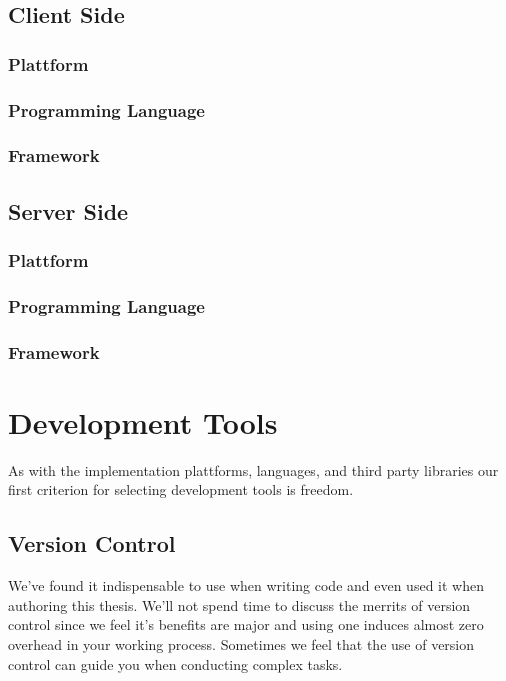\subsection{Client Side}

\subsubsection{Plattform}

\subsubsection{Programming Language}

\subsubsection{Framework}

\subsection{Server Side}

\subsubsection{Plattform}

\subsubsection{Programming Language}

\subsubsection{Framework}

\section{Development Tools}

As with the implementation plattforms, languages, and third party libraries
our first criterion for selecting development tools is freedom.

\subsection{Version Control}

We've found it indispensable to use  when writing code
and even used it when authoring this thesis. We'll not spend time to discuss
the merrits of version control since we feel it's benefits are major and
using one induces almost zero overhead in your working process. Sometimes we
feel that the use of version control can guide you when conducting complex
tasks.

